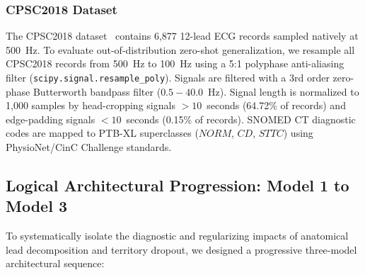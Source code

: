 \documentclass[5p,twocolumn,10pt]{elsarticle}
\begin{document}
\subsubsection{CPSC2018 Dataset}
The CPSC2018 dataset~\cite{liu2018open} contains 6,877 12-lead ECG records sampled natively at 500~Hz. To evaluate out-of-distribution zero-shot generalization, we resample all CPSC2018 records from 500~Hz to 100~Hz using a 5:1 polyphase anti-aliasing filter (\texttt{scipy.signal.resample\_poly}). Signals are filtered with a 3rd order zero-phase Butterworth bandpass filter ($0.5 - 40.0$~Hz). Signal length is normalized to 1,000 samples by head-cropping signals $> 10$~seconds (64.72\% of records) and edge-padding signals $< 10$~seconds (0.15\% of records). SNOMED CT diagnostic codes are mapped to PTB-XL superclasses ($NORM$, $CD$, $STTC$) using PhysioNet/CinC Challenge standards.

\subsection{Logical Architectural Progression: Model 1 to Model 3}
To systematically isolate the diagnostic and regularizing impacts of anatomical lead decomposition and territory dropout, we designed a progressive three-model architectural sequence:
\end{document}
